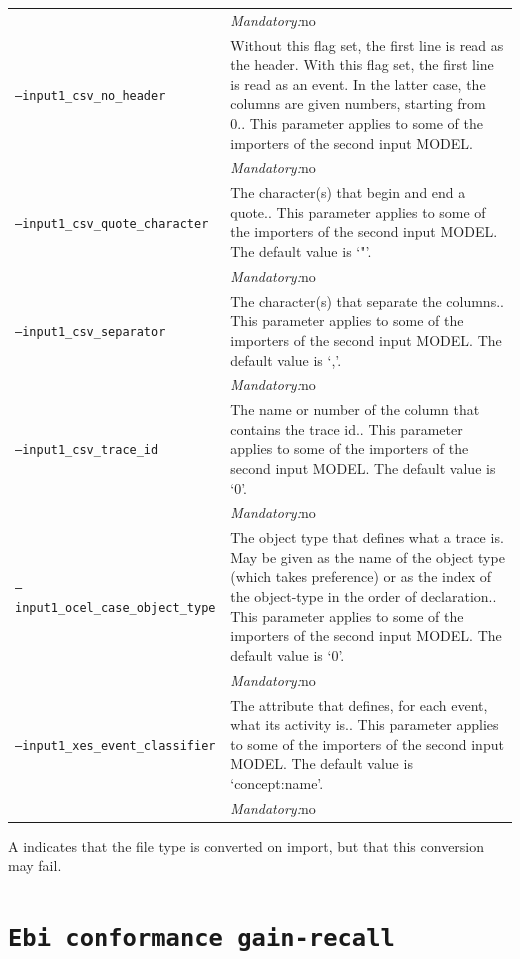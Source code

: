 {\begin{tabularx}{\linewidth}{lX}
&\textit{Mandatory:}\quad no\\
\texttt{--input1\_csv\_no\_header} & Without this flag set, the first line is read as the header. 
    With this flag set, the first line is read as an event. In the latter case, the columns are given numbers, starting from 0.. This parameter applies to some of the importers of the second input MODEL. \\
&\textit{Mandatory:}\quad no\\
\texttt{--input1\_csv\_quote\_character} & The character(s) that begin and end a quote.. This parameter applies to some of the importers of the second input MODEL. The default value is `"'.\\
&\textit{Mandatory:}\quad no\\
\texttt{--input1\_csv\_separator} & The character(s) that separate the columns.. This parameter applies to some of the importers of the second input MODEL. The default value is `,'.\\
&\textit{Mandatory:}\quad no\\
\texttt{--input1\_csv\_trace\_id} & The name or number of the column that contains the trace id.. This parameter applies to some of the importers of the second input MODEL. The default value is `0'.\\
&\textit{Mandatory:}\quad no\\
\texttt{--input1\_ocel\_case\_object\_type} & The object type that defines what a trace is. May be given as the name of the object type (which takes preference) or as the index of the object-type in the order of declaration.. This parameter applies to some of the importers of the second input MODEL. The default value is `0'.\\
&\textit{Mandatory:}\quad no\\
\texttt{--input1\_xes\_event\_classifier} & The attribute that defines, for each event, what its activity is.. This parameter applies to some of the importers of the second input MODEL. The default value is `concept:name'.\\
&\textit{Mandatory:}\quad no\\
\bottomrule
\end{tabularx}
A \textdagger{} indicates that the file type is converted on import, but that this conversion may fail.
\clearpage\section{\texttt{Ebi conformance gain-recall}}
\label{command:Ebi conformance gain-recall}
}
